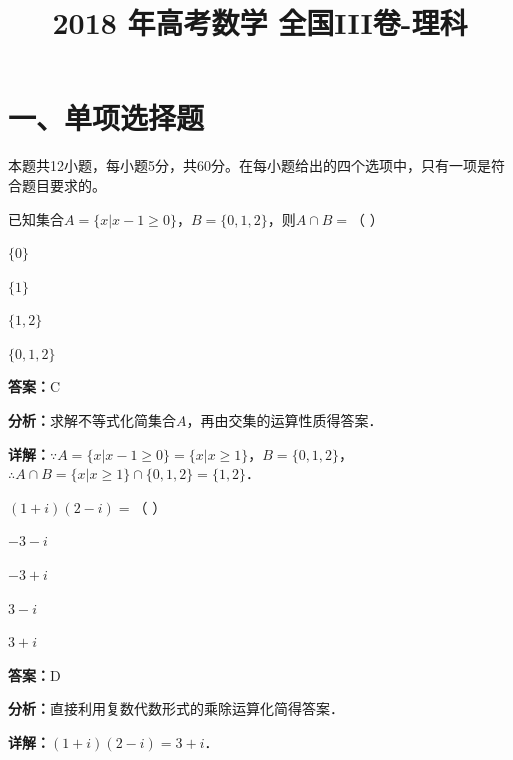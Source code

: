 ﻿\title{2018 年高考数学 全国III卷-理科}
\date{}
\maketitle

\section*{一、单项选择题}
本题共12小题，每小题5分，共60分。在每小题给出的四个选项中，只有一项是符合题目要求的。

\begin{question}[points=5]
已知集合$A=\{x|x-1\geq 0\}$，$B=\{0,1,2\}$，则$A\cap B=$（ ）
\begin{choices}
  \item $\{0\}$
  \item $\{1\}$
  \item $\{1,2\}$
  \item $\{0,1,2\}$
\end{choices}
\begin{solution}
\textbf{答案：}C

\textbf{分析：}求解不等式化简集合$A$，再由交集的运算性质得答案．

\textbf{详解：}$\because A=\{x|x-1\geq 0\}=\{x|x\geq 1\}$，$B=\{0,1,2\}$，$\therefore A\cap B=\{x|x\geq 1\}\cap\{0,1,2\}=\{1,2\}$．
\end{solution}
\end{question}

\begin{question}[points=5]
$(1+i)(2-i)=$（ ）
\begin{choices}
  \item $-3-i$
  \item $-3+i$
  \item $3-i$
  \item $3+i$
\end{choices}
\begin{solution}
\textbf{答案：}D

\textbf{分析：}直接利用复数代数形式的乘除运算化简得答案．

\textbf{详解：}$(1+i)(2-i)=3+i$．
\end{solution}
\end{question}

